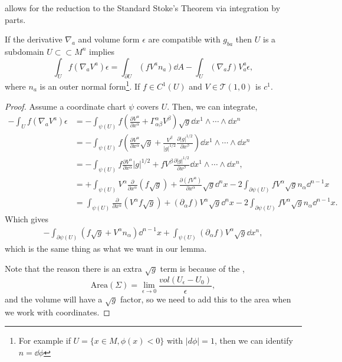 \documentclass{article}
\numberwithin{equation}{section}
\begin{document}
allows for the reduction to the Standard Stoke's Theorem via integration by parts.
\begin{lemma}
    If the derivative $\nabla_a$ and volume form $\epsilon$ are compatible with $g_{ba}$ then $U$ is a subdomain $U\subset\subset M^n$ implies
    \begin{equation*}
        \int_{U} f(\nabla_a V^a)\epsilon = \int_{\partial U} (fV^a n_a) \dd{A} - \int_U (\nabla_a f)V_a^a \epsilon,
    \end{equation*}
    where $n_a$ is an outer normal form\footnote{For example if $U=\{x\in M, \phi(x) < 0\}$ with $|d\phi| = 1$, then we can identify $n=\dd{\phi}$}. If $f\in C^1(U)$ and $V \in \mathcal{T}(1,0)$ is $c^1.$
\end{lemma}
\begin{proof}
    Assume a coordinate chart $\psi$ covers $U$. Then, we can integrate,
\begin{align*}
    -\int_{U} f(\nabla_a V^a)\epsilon 
    &=  -\int_{\psi(U)} f\left(\frac{\partial V^\alpha}{\partial x^\alpha} + \Gamma^{\alpha}_{\alpha\beta}V^\beta\right)\sqrt{g} \dd{x}^1\wedge \cdots \wedge \dd{x}^n\\ 
    &= -\int_{\psi(U)} f\left(\frac{\partial V^\alpha}{\partial x^\alpha}\sqrt{g} + \frac{V^\beta}{|g|^{1/2}} \frac{\partial |g|^{1/2}}{\partial x^\beta}\right) \dd{x}^1\wedge \cdots \wedge \dd{x}^n \\ 
    &= -\int_{\psi(U)} f\frac{\partial V^\alpha}{\partial x^\alpha}|g|^{1/2} + fV^\beta \frac{\partial |g|^{1/2}}{\partial x^\beta} \dd{x}^1\wedge \cdots \wedge \dd{x}^n, \\ 
    &= +\int_{\psi(U)} V^\alpha \frac{\partial}{\partial x^\alpha}(f\sqrt{g}) + \frac{\partial(fV^\alpha)}{\partial x^\alpha}\sqrt{g} \dd^n{x} - 2\int_{\partial \psi(U)} fV^\alpha \sqrt{g} n_\alpha \dd^{n-1}{x} \\ 
    &= \int_{\psi(U)} \frac{\partial}{\partial x^\alpha}(V^\alpha f \sqrt{g}) + (\partial_\alpha f)V^\alpha \sqrt{g} \dd^n{x} - 2\int_{\partial \psi(U)} fV^\alpha \sqrt{g} n_\alpha \dd^{n-1}x.
\end{align*}
Which gives 
\begin{align*}
    -\int_{\partial \psi(U)} (f\sqrt{g} + V^\alpha n_\alpha) \dd^{n-1}x + \int_{\psi(U)} (\partial_\alpha f)V^{\alpha}\sqrt{g} \dd{x}^n,
\end{align*}
which is the same thing as what we want in our lemma.

Note that the reason there is an extra $\sqrt{g}$ term is because of the ,
\begin{equation*}
    \text{Area}(\Sigma) = \lim_{\epsilon \to 0} \frac{vol(U_{\epsilon}-U_0)}{\epsilon},
\end{equation*}
and the volume will have a $\sqrt{g}$ factor, so we need to add this to the area when we work with coordinates.
\end{proof}
\end{document}
